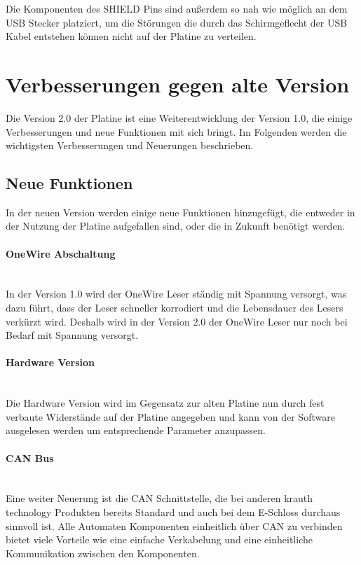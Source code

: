 Die Komponenten des SHIELD Pins sind außerdem so nah wie möglich an dem \ac{USB} Stecker platziert, um die Störungen die durch das
Schirmgeflecht der \ac{USB} Kabel entstehen können nicht auf der Platine zu verteilen.

\clearpage

\section{Verbesserungen gegen alte Version}
Die Version 2.0 der Platine ist eine Weiterentwicklung der Version 1.0, die einige Verbesserungen und neue Funktionen mit sich bringt.
Im Folgenden werden die wichtigsten Verbesserungen und Neuerungen beschrieben.

\subsection{Neue Funktionen}
In der neuen Version werden einige neue Funktionen hinzugefügt, die entweder in der Nutzung der Platine aufgefallen sind, oder
die in Zukunft benötigt werden.

\paragraph{OneWire Abschaltung}\mbox{}\\
In der Version 1.0 wird der OneWire Leser ständig mit Spannung versorgt, was dazu führt, dass der Leser schneller korrodiert
und die Lebensdauer des Lesers verkürzt wird. Deshalb wird in der Version 2.0 der OneWire Leser nur noch bei Bedarf mit Spannung 
versorgt.

\paragraph{Hardware Version}\mbox{}\\
Die Hardware Version wird im Gegensatz zur alten Platine nun durch fest verbaute Widerstände auf der Platine angegeben und kann 
von der Software ausgelesen werden um entsprechende Parameter anzupassen.

\paragraph{\ac{CAN} Bus}\mbox{}\\
Eine weiter Neuerung ist die \ac{CAN} Schnittstelle, die bei anderen krauth technology Produkten bereits Standard und auch
bei dem E-Schloss durchaus sinnvoll ist. Alle Automaten Komponenten einheitlich über \ac{CAN} zu verbinden bietet viele Vorteile
wie eine einfache Verkabelung und eine einheitliche Kommunikation zwischen den Komponenten.

